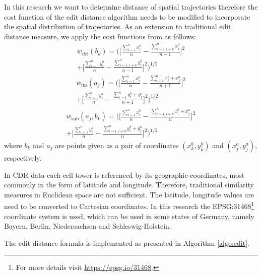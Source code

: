 In this research we want to determine distance of spatial trajectories therefore the cost function of the edit distance algorithm needs to be modified to incorporate the spatial distribution of trajectories. As an extension to traditional edit distance measure, we apply the cost functions from \cite{spatial_edit} as follows:
\begin{multline*}
w_{{\mathrm  {del}}} (b_{{k}}) = \biggl(\biggl[\frac{\sum \limits_{i=1}^n x_{i}^{b}}{n}-\frac{\sum \limits_{i=1, i \neq k}^n x_{i}^{b}}{n-1}\biggr]^2 \\+ \biggl[ \frac{\sum \limits_{i=1}^n y_{i}^{b}}{n}-\frac{\sum \limits_{i=1, i \neq k}^n y_{i}^{b}}{n-1}\biggr]^2\biggr)^{1/2}
\end{multline*}
\begin{multline*}
w_{{\mathrm  {ins}}} (a_{{j}}) = \biggl(\biggl[\frac{\sum \limits_{i=1}^n x_{i}^{b}}{n}-\frac{\sum \limits_{i=1}^n x_{i}^{b} + x_{j}^{a}}{n+1}\biggr]^2 \\ + \biggl[ \frac{\sum \limits_{i=1}^n y_{i}^{b}}{n}-\frac{\sum \limits_{i=1}^n y_{i}^{b} + y_{j}^{a}}{n+1}\biggr]^2\biggr)^{1/2}
\end{multline*}
\begin{multline*}
w_{{\mathrm  {sub}}} (a_{{j}}, b_{{k}}) = \biggl( \biggl[\frac{\sum \limits_{i=1}^n x_{i}^{b}}{n}-\frac{\sum \limits_{i=1, i \neq k}^n x_{i}^{b} + x_{j}^{a}}{n}\biggr]^2\\ + \biggl[\frac{\sum \limits_{i=1}^n y_{i}^{b}}{n}-\frac{\sum \limits_{i=1, i \neq k}^n y_{i}^{b} + y_{j}^{a}}{n}\biggr]^2 \biggr)^{1/2}
\end{multline*}
where $b_{{k}}$ and $a_{{j}}$ are points given as a pair of coordinates $(x_{{k}}^{b}, y_{{k}}^{b})$ and $(x_{{j}}^{a}, y_{{j}}^{a})$, respectively.

In CDR data each cell tower is referenced by its geographic coordinates, most commonly in the form of latitude and longitude. Therefore, traditional similarity measures in Euclidean space are not sufficient. The latitude, longitude values are need to be converted to Cartesian coordinates. In this research the EPSG:31468\footnote{For more details visit \url{https://epsg.io/31468}.} coordinate system is used, which can be used in some states of Germany, namely Bayern, Berlin, Niedersachsen and Schleswig-Holstein.

The edit distance formula is implemented as presented in Algorithm \ref{algo:edit}.

